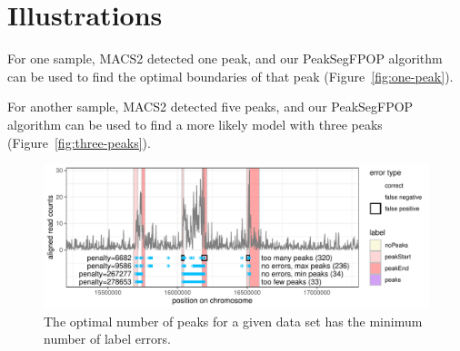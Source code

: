 \documentclass[article]{jss}
\newcommand{\fct}[1]{\code{#1()}}
\begin{document}
\section{Illustrations} \label{sec:illustrations}

For one sample, MACS2 detected one peak, and our PeakSegFPOP algorithm
can be used to find the optimal boundaries of that peak
(Figure~\ref{fig:one-peak}).

For another sample, MACS2 detected five peaks, and our PeakSegFPOP
algorithm can be used to find a more likely model with three peaks
(Figure~\ref{fig:three-peaks}).


\begin{figure}[t!]
\centering
\includegraphics{jss-figure-label-error}
\caption{\label{fig:label-error} The optimal number of peaks for a given data set has the minimum number of label errors.}
\end{figure}
\end{document}
